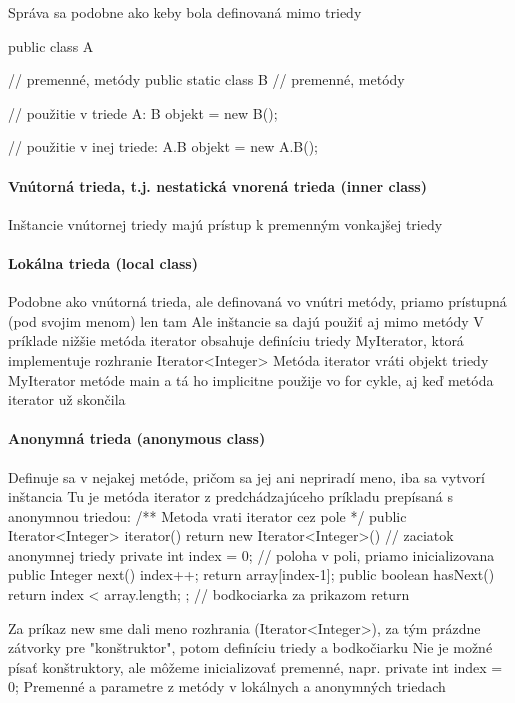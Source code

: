 		Správa sa podobne ako keby bola definovaná mimo triedy
		
		public class A {
		   // premenné, metódy
		   public static class B {
		      // premenné, metódy
		   }
		   
		   // použitie v triede A:
		   B objekt = new B();
		}

		// použitie v inej triede:
		A.B objekt = new A.B();


		\paragraph{Vnútorná trieda, t.j. nestatická vnorená trieda (inner class)}

		Inštancie vnútornej triedy majú prístup k premenným vonkajšej triedy
		
		\paragraph{Lokálna trieda (local class)}

		Podobne ako vnútorná trieda, ale definovaná vo vnútri metódy, priamo prístupná (pod svojim menom) len tam
		Ale inštancie sa dajú použiť aj mimo metódy
		V príklade nižšie metóda iterator obsahuje definíciu triedy MyIterator, ktorá implementuje rozhranie Iterator<Integer>
		Metóda iterator vráti objekt triedy MyIterator metóde main a tá ho implicitne použije vo for cykle, aj keď metóda iterator už skončila

		
		\paragraph{Anonymná trieda (anonymous class)}
		Definuje sa v nejakej metóde, pričom sa jej ani nepriradí meno, iba sa vytvorí inštancia
		Tu je metóda iterator z predchádzajúceho príkladu prepísaná s anonymnou triedou:
		    /** Metoda vrati iterator cez pole */
		    public Iterator<Integer> iterator() {
			return new Iterator<Integer>() { // zaciatok anonymnej triedy
			    private int index = 0;  // poloha v poli, priamo inicializovana
			    public Integer next() { 
				index++;
				return array[index-1]; 
			    }
			    public boolean hasNext() {
				return index < array.length;
			    }
			};  // bodkociarka za prikazom return
		    }

		Za príkaz new sme dali meno rozhrania (Iterator<Integer>), za tým prázdne zátvorky pre "konštruktor", potom definíciu triedy a bodkočiarku
		Nie je možné písať konštruktory, ale môžeme inicializovať premenné, napr. private int index = 0;
		Premenné a parametre z metódy v lokálnych a anonymných triedach

